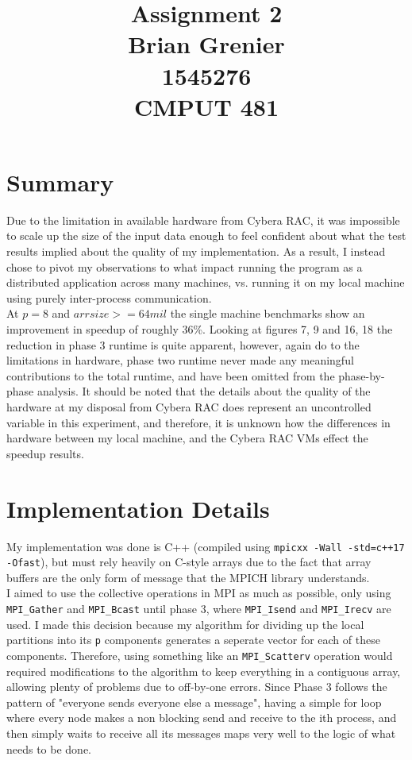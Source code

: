\documentclass[11pt]{report}
\title{Assignment 2
\\Brian Grenier
\\1545276
\\CMPUT 481}
\begin{document}
\maketitle

\section*{Summary}
Due to the limitation in available hardware from Cybera RAC, it was impossible to scale up the size of
the input data enough to feel confident about what the test results implied about the quality of my
implementation. As a result, I instead chose to pivot my observations to what impact running the program 
as a distributed application across many machines, vs. running it on my local machine using purely
inter-process communication.\\
At $p=8$ and $arrsize>=64mil$ the single machine benchmarks show an improvement in speedup of
roughly 36\%. Looking at figures 7, 9 and 16, 18 the reduction in phase 3 runtime is quite apparent, however, again do to the limitations in hardware, phase two runtime never made any meaningful contributions to the total runtime, and have been omitted from the phase-by-phase analysis. It should be noted that the details about the quality of the hardware at my disposal from Cybera RAC does represent
an uncontrolled variable in this experiment, and therefore, it is unknown how the differences in hardware
between my local machine, and the Cybera RAC VMs effect the speedup results.


\section*{Implementation Details}
My implementation was done is C++ (compiled using \verb|mpicxx -Wall -std=c++17 -Ofast|), but must rely heavily on C-style arrays due to
the fact that array buffers are the only form of message that the MPICH library 
understands.\\
I aimed to use the collective operations in MPI as much as possible, only using \verb|MPI_Gather| and \verb|MPI_Bcast| until phase 3, where \verb|MPI_Isend| and \verb|MPI_Irecv| are used. I made this decision because my algorithm for dividing
up the local partitions into its \verb|p| components generates a seperate vector
for each of these components. Therefore, using something like an \verb|MPI_Scatterv| operation would required modifications to the algorithm to keep everything in a contiguous array, allowing plenty of problems due to off-by-one errors. Since Phase 3 follows the pattern of "everyone sends everyone else a message", having a simple for loop where every node makes a non blocking send and receive to the ith process, and then simply waits to receive all its messages maps very well to the logic of what needs to be done.
\end{document}

